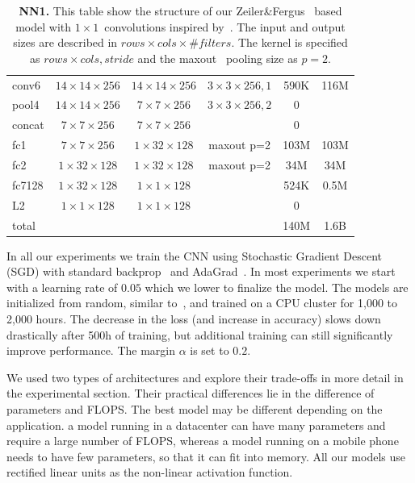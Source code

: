 \documentclass[10pt,twocolumn,letterpaper]{article}
\begin{document}
\begin{table}
\begin{center}
{\begin{tabular}[H]{|l|c|c|c|c|c|}
conv6       & $14{\times}14{\times}256 $ & $14{\times}14{\times}256 $ & $3{\times}3{\times}256,1$ & 590K & 116M \\
pool4       & $14{\times}14{\times}256 $ & $7{\times}7{\times}256   $ & $3{\times}3{\times}256,2$ & 0 & \\
concat      & $7{\times}7{\times}256   $ & $7{\times}7{\times}256   $ &                      & 0 & \\
fc1         & $7{\times}7{\times}256   $ & $1{\times}32{\times}128  $ & maxout p=2           & 103M & 103M \\
fc2         & $1{\times}32{\times}128  $ & $1{\times}32{\times}128  $ & maxout p=2           & 34M & 34M \\
fc7128      & $1{\times}32{\times}128  $ & $1{\times}1{\times}128   $ &                      & 524K & 0.5M \\
L2 & $1{\times}1{\times}128   $ & $1{\times}1{\times}128   $ &                      & 0 & \\
\hline
\hline
total       &            &            &            & 140M &  1.6B \\
\hline
\end{tabular}
}
\end{center}
\caption{{\bf NN1.} This table show the structure of our
  Zeiler\&Fergus~\cite{zeilerfergus} based model with $1{\times}1$~convolutions
  inspired by~\cite{networkinnetwork}. The input and output sizes are described
  in \mbox{$rows\times cols\times\#filters$}. The kernel is specified as
  \mbox{$rows\times cols, stride$} and the
maxout~\cite{Goodfellow13maxoutnetworks} pooling size as $p=2$.}
\label{tab:nn_zeiler_fergus}
\end{table}

In all our experiments we train the CNN using Stochastic Gradient Descent (SGD)
with standard backprop~\cite{lecun1989backprop,backprop1986} and
AdaGrad~\cite{DuchiAdagrad}. In most experiments we start with a learning rate
of $0.05$ which we lower to finalize the model. The models are initialized from
random, similar to~\cite{SzegedyILSVRC2014}, and trained on a CPU cluster for
1,000 to 2,000 hours. The decrease in the loss (and increase in accuracy) slows
down drastically after 500h of training, but additional training can still
significantly improve performance. The margin $\alpha$ is set to $0.2$.

We used two types of architectures and explore their trade-offs in more detail
in the experimental section. Their practical differences lie in the difference
of parameters and FLOPS. The best model may be different depending on the
application. \Eg a model running in a datacenter can have many parameters and
require a large number of FLOPS, whereas a model running on a mobile phone
needs to have few parameters, so that it can fit into memory. All our models
use rectified linear units as the non-linear activation function.
\end{document}
